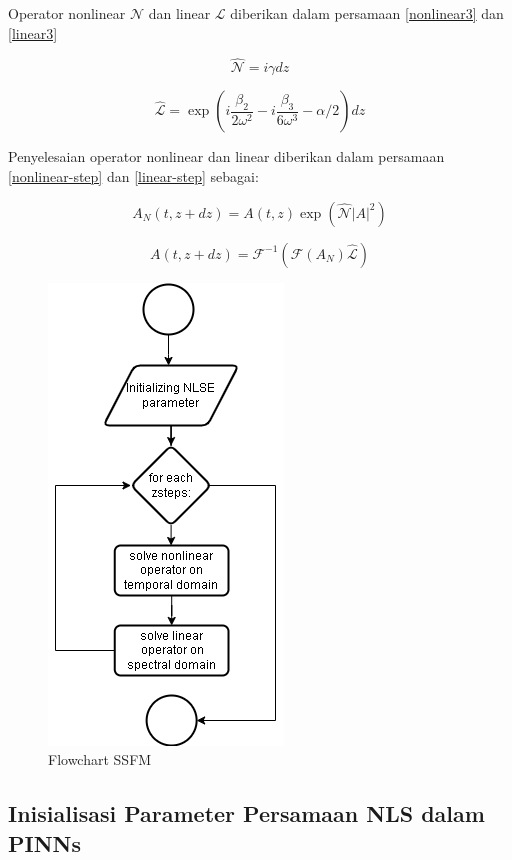 Operator nonlinear $\mathcal{N}$ dan linear $\mathcal{L}$ diberikan dalam persamaan \eqref{nonlinear3} dan \eqref{linear3}

\begin{equation}
    \hat{\mathcal{N}} = i\gamma dz
    \label{nonlinear3}
\end{equation}

\begin{equation}
    \hat{\mathcal{L}} = \exp\left( i\frac{\beta_2}{2\omega^2}-i\frac{\beta_3}{6\omega^3} -\alpha/2 \right)dz
    \label{linear3}
\end{equation}

Penyelesaian operator nonlinear dan linear diberikan dalam persamaan \eqref{nonlinear-step} dan \eqref{linear-step} sebagai: 

\begin{equation}
    A_N(t,z+dz) = A(t,z)\exp(\hat{\mathcal{N}}|A|^2)
    \label{nonlinear-step}
\end{equation}

\begin{equation}
    A(t,z+dz) = \mathcal{F}^{-1}(\mathcal{F}(A_N)\hat{\mathcal{L}})
    \label{linear-step}
\end{equation}

\newpage
\begin{figure}[htbp]
    \centering
    \includegraphics[width=0.4\linewidth]{Gambar/SSFM-F.png}
    \caption{Flowchart SSFM} 
    \label{fig:ssfm-flowchart}
\end{figure}


\subsection{Inisialisasi Parameter Persamaan NLS dalam PINNs}

